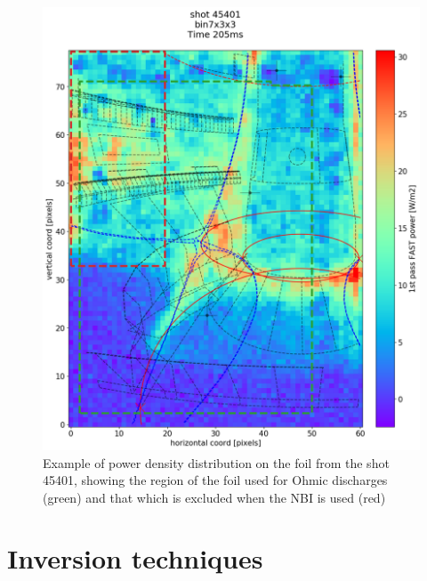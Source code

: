 \begin{figure}[!ht]
	\centering
	\includegraphics[trim={0 0 0 80},clip,width=0.75\linewidth]{Chapters/chapter2/figs/IRVB-MASTU_shot-45401_export_80.png}
	\caption{Example of power density distribution on the foil from the shot 45401, showing the region of the foil used for Ohmic discharges (green) and that which is excluded when the NBI is used (red)}
	\label{fig:foil_excluded}
\end{figure}

\section{Inversion techniques}\label{Inversion techniques}
